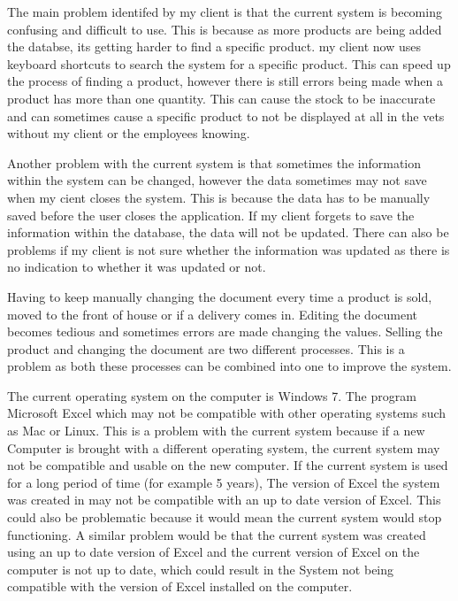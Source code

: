 \begin{flushleft}
The main problem identifed by my client is that the current system is becoming confusing and difficult to use. This is because as more products are being added the databse, its getting harder to find a specific product. my client now uses keyboard shortcuts to search the system  for a specific product. This can speed up the process  of finding a product, however there is still errors being made when a product has more than one quantity. This can cause the stock to be inaccurate and can sometimes cause a specific product to not be displayed at all in the vets without my client or the employees knowing. \par

Another problem with the current system is that sometimes the information within the system can be changed, however the data sometimes may not save when my cient closes the system. This is because the data has to be manually saved before the user closes the application. If my client forgets to save the information within the database, the data will not be updated. There can also be problems if my client is not sure whether the information was updated as there is no indication to whether it was updated or not. \par

Having to keep manually changing the document every time a product is sold, moved to the front of house or if a delivery comes in. Editing the document becomes tedious and sometimes errors are made changing the values. Selling the product and changing the document are two different processes. This is a problem as both these processes can be combined into one to improve the system. \par

The current operating system on the computer is Windows 7. The program Microsoft Excel which may not be compatible with other operating systems such as Mac or Linux. This is a problem with the current system because if a new Computer is brought with a different operating system, the current system may not be compatible and usable on the new computer. If the current system is used for a long period of time (for example 5 years), The version of Excel the system was created in may not be compatible with an up to date version of Excel. This could also be problematic because it would mean the current system would stop functioning. A similar problem would be that the current system was created using an up to date version of Excel and the current version of Excel on the computer is not up to date, which could result in the System not being compatible with the version of Excel installed on the computer. \par

\end{flushleft}
\newpage


